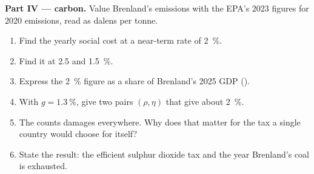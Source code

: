 \begin{problem}
\medskip\noindent\textbf{Part IV --- carbon.} Value Brenland's emissions with the EPA's 2023 figures for 2020
emissions, read as dalens per tonne.
\begin{enumerate}[resume]
\item Find the yearly social cost at a near-term rate of 2~\%.
\item Find it at 2.5 and 1.5~\%.
\item Express the 2~\% figure as a share of Brenland's 2025 GDP ().
\item With $g = 1.3~\%$, give two pairs $(\rho, \eta)$ that give about 2~\%.
\item The  counts damages everywhere. Why does that matter for
the tax a single country would choose for itself?
\item State the result: the efficient sulphur dioxide tax and the year Brenland's coal is
exhausted.
\end{enumerate}
\end{problem}
